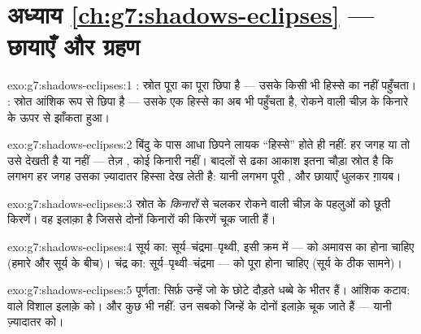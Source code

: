 \section*{अध्याय \ref{ch:g7:shadows-eclipses} --- छायाएँ और ग्रहण}

\begin{solution}{exo:g7:shadows-eclipses:1}
: स्रोत पूरा का पूरा छिपा है --- उसके किसी भी हिस्से का
 नहीं पहुँचता। : स्रोत आंशिक रूप से छिपा है --- उसके एक
हिस्से का  अब भी पहुँचता है, रोकने वाली चीज़ के किनारे के ऊपर से
झाँकता हुआ।
\end{solution}

\begin{solution}{exo:g7:shadows-eclipses:2}
बिंदु के पास आधा छिपने लायक ``हिस्से'' होते ही नहीं: हर जगह या तो उसे
देखती है या नहीं --- तेज़ , कोई किनारी नहीं। बादलों से ढका आकाश
इतना चौड़ा स्रोत है कि लगभग हर जगह उसका ज़्यादातर हिस्सा देख लेती है:
यानी लगभग पूरी , और छायाएँ धुलकर ग़ायब।
\end{solution}

\begin{solution}{exo:g7:shadows-eclipses:3}
स्रोत के \emph{किनारों} से चलकर रोकने वाली चीज़ के पहलुओं को छूती
किरणें।  वह इलाक़ा है जिससे दोनों किनारों की किरणें चूक जाती
हैं।
\end{solution}

\begin{solution}{exo:g7:shadows-eclipses:4}
सूर्य का: सूर्य--चंद्रमा--पृथ्वी, इसी क्रम में ---  को अमावस का
होना चाहिए (हमारे और सूर्य के बीच)। चंद्र का: सूर्य--पृथ्वी--चंद्रमा
---  को पूरा होना चाहिए (सूर्य के ठीक सामने)।
\end{solution}

\begin{solution}{exo:g7:shadows-eclipses:5}
पूर्णता: सिर्फ़ उन्हें जो  के छोटे दौड़ते धब्बे के भीतर हैं।
आंशिक कटाव:  वाले विशाल इलाक़े को। और कुछ भी नहीं: उन सबको
जिन्हें  के दोनों इलाक़े चूक जाते हैं --- यानी ज़्यादातर  को।
\end{solution}

